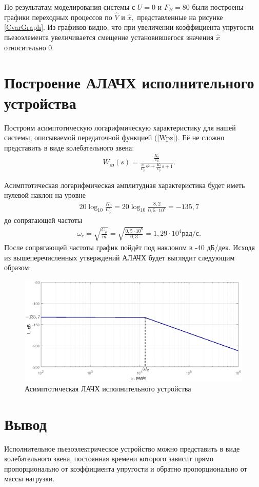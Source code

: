 \documentclass[fleqn, a4paper, 11pt, russian]{article}
\begin{document}
	По результатам моделирования системы с $U = 0$ и $F_B = 80$ были построены графики переходных процессов по $\hat{V}$ и $\hat{x},$ представленные на рисунке \ref{CvarGraph}. Из графиков видно, что при увеличении коэффициента упругости пьезоэлемента увеличивается смещение установившегося значения $\hat{x}$ относительно 0.
	\clearpage
	{\centering
		\section{Построение АЛАЧХ исполнительного устройства}
	}
	Построим асимптотическую логарифмическую характеристику для нашей системы, описываемой передаточной функцией (\ref{Wpz}). Её не сложно представить в виде колебательного звена:
	\begin{align}
		&&W_\text{кз}(s) = \frac{\displaystyle{\frac{K_0}{C_p}}}{\displaystyle{\frac{m}{C_p}}s^2 + \frac{K_d}{C_p}s + 1}.
	\end{align}
	
	Асимптотическая логарифмическая амплитудная характеристика будет иметь нулевой наклон на уровне 
	\begin{align}
		&&20\log_{10} \displaystyle{\frac{K_0}{C_p}} = 20\log_{10} \displaystyle{\frac{8,2}{0,5\cdot10^8}} = -135,7
	\end{align}
	до сопрягающей частоты 
	\begin{align}
		&&\omega_c = \sqrt{\displaystyle{\frac{C_p}{m}}} = \sqrt{\displaystyle{\frac{0,5\cdot10^8}{0,3}}} = 1,29\cdot10^4 \text{рад/с}.
	\end{align}
	После сопрягающей частоты график пойдёт под наклоном в -40 дБ/дек. Исходя из вышеперечисленных утверждений АЛАЧХ будет выглядит следующим образом:
	\begin{figure}[ht!]
		\centering
		\includegraphics[width = \textwidth]{base/ALAPR}
		\caption{Асимптотическая ЛАЧХ исполнительного устройства}
	\end{figure}
	\clearpage
	\section*{Вывод}
	Исполнительное пьезоэлектрическое устройство можно представить в виде колебательного звена, постоянная времени которого зависит прямо пропорционально от коэффициента упругости и обратно пропорционально от массы нагрузки.
	
\end{document}
